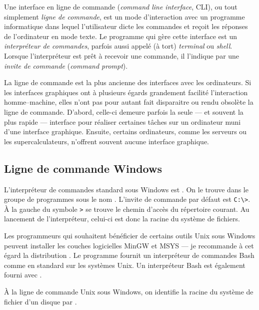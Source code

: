 Une interface en ligne de commande
(\emph{command line interface}, CLI), ou tout simplement \emph{ligne
  de commande}, est un mode d'interaction avec un programme
informatique dans lequel l'utilisateur dicte les commandes et reçoit
les réponses de l'ordinateur en mode texte. Le programme qui gère
cette interface est un \emph{interpréteur de commandes}, parfois aussi
appelé (à tort) \emph{terminal} ou \emph{shell}. Lorsque
l'interpréteur est prêt à recevoir une commande, il l'indique par une
\emph{invite de commande} (\emph{command prompt}).

La ligne de commande est la plus ancienne des interfaces avec les
ordinateurs. Si les interfaces graphiques ont à plusieurs égards
grandement facilité l'interaction homme--machine, elles n'ont pas pour
autant fait disparaitre ou rendu obsolète la ligne de commande.
D'abord, celle-ci demeure parfois la seule --- et souvent la plus
rapide --- interface pour réaliser certaines tâches sur un ordinateur
muni d'une interface graphique. Ensuite, certains ordinateurs, comme
les serveurs ou les supercalculateurs, n'offrent souvent aucune
interface graphique.

\subsection{Ligne de commande Windows}
\label{sec:informatique:cli:windows}

L'interpréteur de commandes standard sous Windows est
. On le trouve dans le groupe
de programmes  sous le nom . L'invite de commande par défaut est \verb=C:\>=. À la
gauche du symbole \verb=>= se trouve le chemin d'accès du répertoire
courant. Au lancement de l'interpréteur, celui-ci est donc la racine
du système de fichiers.

Les programmeurs qui souhaitent bénéficier de certains outils Unix
sous Windows peuvent installer les couches logicielles
MinGW et MSYS --- je recommande à cet
égard la distribution .
Le programme  fournit un interpréteur de commandes
Bash \citep{bash} comme en standard sur les systèmes Unix.
Un interpréteur Bash est également fourni avec
.

À la ligne de commande Unix sous Windows, on identifie la racine
 du système de fichier d'un disque par
.

